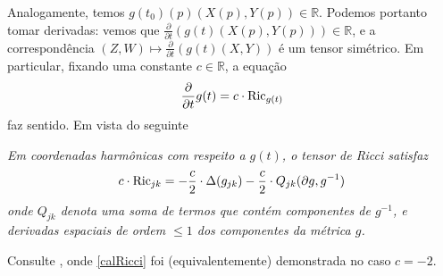 Analogamente, temos $g(t_0)(p)(X(p), Y(p)) \in \mathbb{R}$. Podemos portanto tomar derivadas: vemos que $\frac{\partial}{\partial t}\left(g(t)(X(p), Y(p)) \right) \in \mathbb{R}$, e a correspondência $(Z, W) \mapsto \frac{\partial}{\partial t} \left(g(t)(X, Y) \right)$ é um tensor simétrico. Em particular, fixando uma constante $c \in \mathbb{R}$, a equação
\[
\frac{\partial}{\partial t} g(t) = c \cdot \mathrm{Ric}_{g(t)}
\]
faz sentido. Em vista do seguinte
\begin{lema}
\textit{Em coordenadas harmônicas com respeito a $g(t)$, o tensor de Ricci satisfaz
\begin{equation}\label{calRicci}
c \cdot \mathrm{Ric}_{jk} = -\frac{c}{2} \cdot \Delta(g_{jk}) - \frac{c}{2} \cdot Q_{jk}(\partial g, g^{-1})
\end{equation}
onde $Q_{jk}$ denota uma soma de termos que contém componentes de $g^{-1}$, e derivadas espaciais de ordem $\leq 1$ dos componentes da métrica $g$.
}
\end{lema}
\begin{demm}
    Consulte , onde \cref{calRicci} foi (equivalentemente) demonstrada no caso $c = -2$.
\end{demm}

